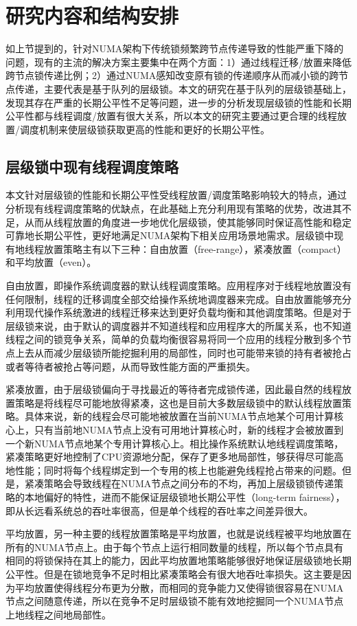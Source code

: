 \section{研究内容和结构安排}
如上节提到的，针对NUMA架构下传统锁频繁跨节点传递导致的性能严重下降的问题，现有的主流的解决方案主要集中在两个方面：1）通过线程迁移/放置来降低跨节点锁传递比例；2）通过NUMA感知改变原有锁的传递顺序从而减小锁的跨节点传递，主要代表是基于队列的层级锁。本文的研究在基于队列的层级锁基础上，发现其存在严重的长期公平性不足等问题，进一步的分析发现层级锁的性能和长期公平性都与线程调度/放置有很大关系，所以本文的研究主要通过更合理的线程放置/调度机制来使层级锁获取更高的性能和更好的长期公平性。

\subsection{层级锁中现有线程调度策略}
本文针对层级锁的性能和长期公平性受线程放置/调度策略影响较大的特点，通过分析现有线程调度策略的优缺点，在此基础上充分利用现有策略的优势，改进其不足，从而从线程放置的角度进一步地优化层级锁，使其能够同时保证高性能和稳定可靠地长期公平性，更好地满足NUMA架构下相关应用场景地需求。层级锁中现有地线程放置策略主有以下三种：自由放置（free-range），紧凑放置（compact）和平均放置（even）。

自由放置，即操作系统调度器的默认线程调度策略。应用程序对于线程地放置没有任何限制，线程的迁移调度全部交给操作系统地调度器来完成。自由放置能够充分利用现代操作系统激进的线程迁移来达到更好负载均衡和其他调度策略。但是对于层级锁来说，由于默认的调度器并不知道线程和应用程序大的所属关系，也不知道线程之间的锁竞争关系，简单的负载均衡很容易将同一个应用的线程分散到多个节点上去从而减少层级锁所能挖掘利用的局部性，同时也可能带来锁的持有者被抢占或者等待者被抢占等问题，从而导致性能方面的严重损失。

紧凑放置，由于层级锁偏向于寻找最近的等待者完成锁传递，因此最自然的线程放置策略是将线程尽可能地放得紧凑，这也是目前大多数层级锁中的默认线程放置策略。具体来说，新的线程会尽可能地被放置在当前NUMA节点地某个可用计算核心上，只有当前地NUMA节点上没有可用地计算核心时，新的线程才会被放置到一个新NUMA节点地某个专用计算核心上。相比操作系统默认地线程调度策略，紧凑策略更好地控制了CPU资源地分配，保存了更多地局部性，够获得尽可能高地性能；同时将每个线程绑定到一个专用的核上也能避免线程抢占带来的问题。但是，紧凑策略会导致线程在NUMA节点之间分布的不均，再加上层级锁锁传递策略的本地偏好的特性，进而不能保证层级锁地长期公平性（long-term fairness），即从长远看系统总的吞吐率很高，但是单个线程的吞吐率之间差异很大。

平均放置，另一种主要的线程放置策略是平均放置，也就是说线程被平均地放置在所有的NUMA节点上。由于每个节点上运行相同数量的线程，所以每个节点具有相同的将锁保持在其上的能力，因此平均放置地策略能够很好地保证层级锁地长期公平性。但是在锁地竞争不足时相比紧凑策略会有很大地吞吐率损失。这主要是因为平均放置使得线程分布更为分散，而相同的竞争能力又使得锁很容易在NUMA节点之间随意传递，所以在竞争不足时层级锁不能有效地挖掘同一个NUMA节点上地线程之间地局部性。

